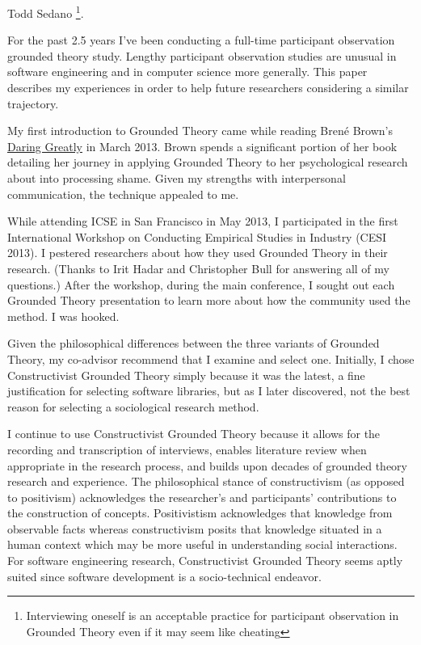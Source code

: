   \textemdash Todd Sedano \footnote{Interviewing oneself is an acceptable practice for participant observation in Grounded Theory even if it may seem like cheating}. 

For the past 2.5 years I've been conducting a full-time participant observation grounded theory study. Lengthy participant observation studies are unusual in software engineering and in computer science more generally. This paper describes my experiences in order to help future researchers considering a similar trajectory. 

My first introduction to Grounded Theory came while reading Bren\'{e} Brown’s \underline{Daring Greatly} \cite{BreneBrownDaringGreatly} in March 2013. Brown spends a significant portion of her book detailing her journey in applying Grounded Theory to her psychological research about into processing shame. Given my strengths with interpersonal communication, the technique appealed to me. 

While attending ICSE in San Francisco in May 2013, I participated in the first International Workshop on Conducting Empirical Studies in Industry (CESI 2013). I pestered researchers about how they used Grounded Theory in their research. (Thanks to Irit Hadar and Christopher Bull for answering all of my questions.) After the workshop, during the main conference, I sought out each Grounded Theory presentation to learn more about how the community used the method. I was hooked. 

Given the philosophical differences between the three variants of Grounded Theory, my co-advisor recommend that I examine and select one. Initially, I chose Constructivist Grounded Theory simply because it was the latest, a fine justification for selecting software libraries, but as I later discovered, not the best reason for selecting a sociological research method. 

I continue to use Constructivist Grounded Theory because it allows for the recording and transcription of interviews, enables literature review when appropriate in the research process, and builds upon decades of grounded theory research and experience. The philosophical stance of constructivism (as opposed to positivism) acknowledges the researcher's and participants' contributions to the construction of concepts. Positivistism acknowledges that knowledge from observable facts whereas constructivism posits that knowledge situated in a human context which may be more useful in understanding social interactions. For software engineering research, Constructivist Grounded Theory seems aptly suited since software development is a socio-technical endeavor.

